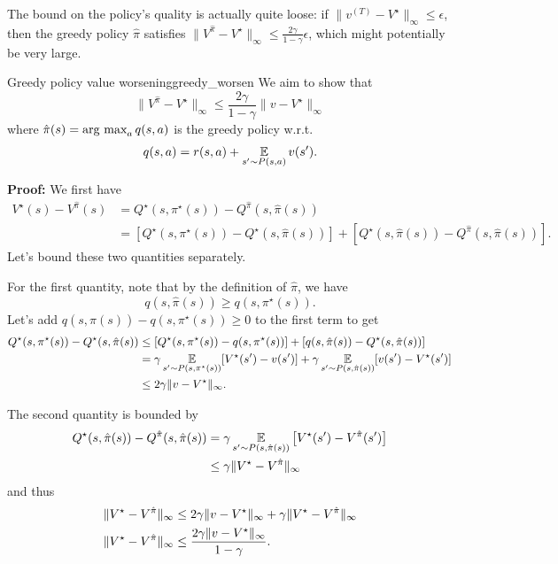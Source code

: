 \documentclass[../main/main]{subfiles}
\begin{document}
The bound on the policy's quality is actually quite loose: if $\|v^{(T)} - V^\star\|_{\infty} \le \epsilon$, then the greedy policy $\hat \pi$ satisfies $\|V^{\hat \pi} - V^\star\|_{\infty} \le \frac{2\gamma}{1-\gamma} \epsilon$, which might potentially be very large.

\begin{theorem}{Greedy policy value worsening}{greedy_worsen}
    We aim to show that
    \[
        \|V^{\hat \pi} - V^\star \|_{\infty} \le \frac{2 \gamma}{1-\gamma} \|v - V^\star\|_{\infty}
    \]
    where $\hat \pi(s) = \operatorname*{\textrm{arg\ max}}_a q(s, a)$ is the greedy policy w.r.t. \[ q(s, a) = r(s, a) + \operatorname*{\mathbb{E}}_{s' \sim P(s, a)} v(s'). \]

    \textbf{Proof:} We first have
    \begin{align*}
        V^{\star}(s) - V^{\hat \pi}(s) &= Q^{\star}(s,\pi^\star(s)) - Q^{\hat \pi}(s, \hat \pi(s))\\
        &= [Q^{\star}(s,\pi^\star(s)) - Q^{\star}(s, \hat \pi(s))] + [Q^{\star}(s, \hat \pi(s)) - Q^{\hat \pi}(s, \hat \pi(s))].
    \end{align*}
    Let's bound these two quantities separately.

    For the first quantity, note that by the definition of $\hat \pi$, we have
    \[ q(s, \hat \pi(s)) \ge q(s,\pi^\star(s)). \]
    Let's add $q(s, \hat \pi(s)) - q(s,\pi^\star(s)) \ge 0$ to the first term to get
    \begin{align*}
        Q^{\star}(s,\pi^\star(s)) - Q^{\star}(s, \hat \pi(s)) &\le [Q^{\star}(s,\pi^\star(s))- q(s,\pi^\star(s))] + [q(s, \hat \pi(s)) - Q^{\star}(s, \hat \pi(s))] \\
        &= \gamma \operatorname*{\mathbb{E}}_{s' \sim P(s, \pi^{\star}(s))} [ V^{\star}(s') - v(s') ] + \gamma \operatorname*{\mathbb{E}}_{s' \sim P(s, \hat \pi(s))} [ v(s') - V^{\star}(s') ] \\
        &\le 2 \gamma \|v - V^{\star}\|_{\infty}.
    \end{align*}

    The second quantity is bounded by
    \begin{align*}
        Q^{\star}(s, \hat \pi(s)) - Q^{\hat \pi}(s, \hat \pi(s))
        &=
        \gamma \operatorname*{\mathbb{E}}_{s'\sim P(s, \hat \pi(s))}\left[ V^\star(s') - V^{\hat \pi}(s') \right] \\
        & \leq 
        \gamma \|V^{\star} - V^{\hat \pi}\|_\infty
    \end{align*}
    and thus
    \begin{align*}
        \|V^\star - V^{\hat \pi}\|_\infty &\le 2 \gamma \|v - V^{\star}\|_{\infty} + \gamma \|V^{\star} - V^{\hat \pi}\|_\infty \\
        \|V^\star - V^{\hat \pi}\|_\infty &\le {2 \gamma \|v - V^{\star}\|_{\infty} \over 1-\gamma}.
    \end{align*}
\end{theorem}
\end{document}
